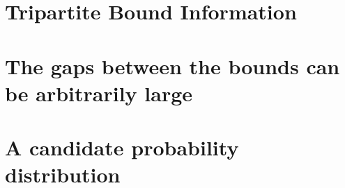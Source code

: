 \section{Tripartite Bound Information}
\section{The gaps between the bounds can be arbitrarily large}
\section{A candidate probability distribution}
